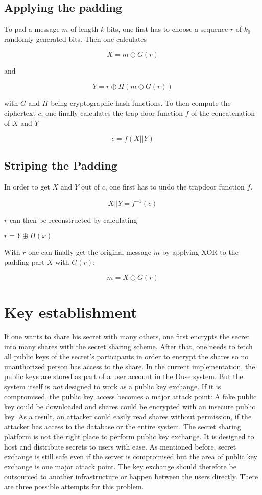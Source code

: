 \subsection{Applying the padding}

To pad a message $m$ of length $k$ bits, one first has to choose a sequence
$r$ of $k_0$ randomly generated bits. Then one calculates

$$X = m \oplus G(r)$$

and

$$Y = r \oplus H(m \oplus G(r))$$

with $G$ and $H$ being cryptographic hash functions. To then compute the
ciphertext $c$, one finally calculates the trap door function $f$ of the
concatenation of $X$ and $Y$

$$c = f(X || Y)$$

\subsection{Striping the Padding}

In order to get $X$ and $Y$ out of $c$, one first has to undo the
trapdoor function $f$.

$$X || Y = f^{-1}(c)$$

$r$ can then be reconstructed by calculating

$r = Y \oplus H(x)$

With $r$ one can finally get the original message $m$ by applying XOR
to the padding part $X$ with $G(r)$:

$$m = X \oplus G(r)$$

\section{Key establishment}
\label{sec:key_establishment}

If one wants to share his secret with many others, one first encrypts the
secret into many shares with the secret sharing scheme. After that, one needs
to fetch all public keys of the secret's participants in order to encrypt the
shares so no unauthorized person has access to the share. In the current
implementation, the public keys are stored as part of a user account in the
Duse system. But the system itself is \textit{not} designed to work as a public
key exchange. If it is compromised, the public key access becomes a major
attack point: A fake public key could be downloaded and shares could be
encrypted with an insecure public key. As a result, an attacker could easily
read shares without permission, if the attacker has access to the database or
the entire system. The secret sharing platform is not the right place to
perform public key exchange. It is designed to host and distribute secrets to
users with ease.  As mentioned before, secret exchange is still safe even if
the server is compromised but the area of public key exchange is one major
attack point.  The key exchange should therefore be outsourced to another
infrastructure or happen between the users directly. There are three possible
attempts for this problem.


